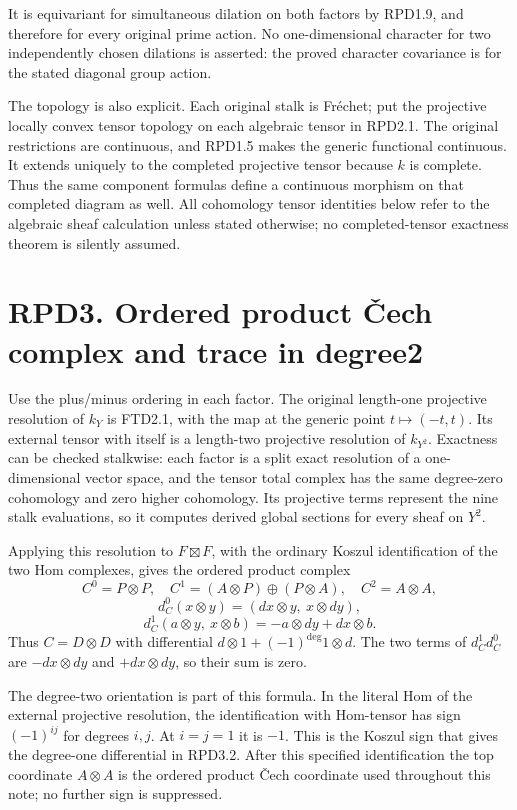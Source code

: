 It is equivariant for simultaneous dilation on both factors by RPD1.9,
and therefore for every original prime action. No one-dimensional
character for two independently chosen dilations is asserted: the proved
character covariance is for the stated diagonal group action.

The topology is also explicit. Each original stalk is Fréchet; put the
projective locally convex tensor topology on each algebraic tensor in
RPD2.1. The original restrictions are continuous, and RPD1.5 makes the
generic functional continuous. It extends uniquely to the completed
projective tensor because \(k\) is complete. Thus the same component
formulas define a continuous morphism on that completed diagram as well.
All cohomology tensor identities below refer to the algebraic sheaf
calculation unless stated otherwise; no completed-tensor exactness
theorem is silently assumed.

\section{RPD3. Ordered product Čech complex and trace in
degree2}\label{rpd3.-ordered-product-ux10dech-complex-and-trace-in-degree2}

Use the plus/minus ordering in each factor. The original length-one
projective resolution of \(k_Y\) is FTD2.1, with the map at the generic
point \(t\mapsto(-t,t)\). Its external tensor with itself is a
length-two projective resolution of \(k_{Y^2}\). Exactness can be
checked stalkwise: each factor is a split exact resolution of a
one-dimensional vector space, and the tensor total complex has the same
degree-zero cohomology and zero higher cohomology. Its projective terms
represent the nine stalk evaluations, so it computes derived global
sections for every sheaf on \(Y^2\).

Applying this resolution to \(F\boxtimes F\), with the ordinary Koszul
identification of the two Hom complexes, gives the ordered product
complex \[
C^0=P\otimes P,\quad
C^1=(A\otimes P)\oplus(P\otimes A),\quad
C^2=A\otimes A,
\tag{RPD3.1}
\] \[
d_C^0(x\otimes y)=(dx\otimes y,\ x\otimes dy),
\] \[
d_C^1(a\otimes y,\ x\otimes b)
=-a\otimes dy+dx\otimes b.
\tag{RPD3.2}
\] Thus \(C=D\otimes D\) with differential
\(d\otimes1+(-1)^{\deg}1\otimes d\). The two terms of \(d_C^1d_C^0\) are
\(-dx\otimes dy\) and \(+dx\otimes dy\), so their sum is zero.

The degree-two orientation is part of this formula. In the literal Hom
of the external projective resolution, the identification with
Hom-tensor has sign \((-1)^{ij}\) for degrees \(i,j\). At \(i=j=1\) it
is \(-1\). This is the Koszul sign that gives the degree-one
differential in RPD3.2. After this specified identification the top
coordinate \(A\otimes A\) is the ordered product Čech coordinate used
throughout this note; no further sign is suppressed.

